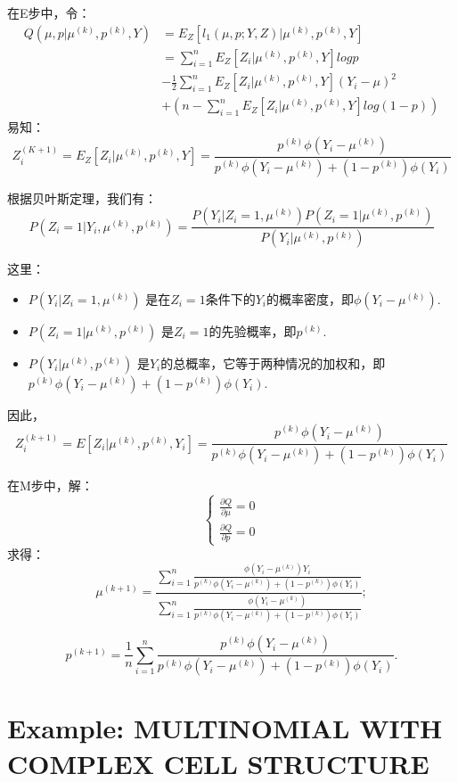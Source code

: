 \documentclass[UTF8,12pt]{ctexart}
\numberwithin{equation}{section}%
\begin{document}
	在E步中，令：
	\begin{align*}
		Q(\mu,p|\mu^{(k)},p^{(k)},Y)
		&=E_Z[l_1(\mu,p;Y,Z)|\mu^{(k)},p^{(k)},Y]\\
		&=\sum_{i=1}^{n}E_Z[Z_i|\mu^{(k)},p^{(k)},Y]logp\\
		&-\frac{1}{2}\sum_{i=1}^{n}E_Z[Z_i|\mu^{(k)},p^{(k)},Y](Y_i-\mu)^2\\
		&+(n-\sum_{i=1}^{n}E_Z[Z_i|\mu^{(k)},p^{(k)},Y]log(1-p))
	\end{align*}
	易知：
	$$Z_i^{(K+1)}=E_Z[Z_i|\mu^{(k)},p^{(k)},Y]=\frac{p^{(k)}\phi(Y_i-\mu^{(k)})}{p^{(k)}\phi(Y_i-\mu^{(k)})+(1-p^{(k)})\phi(Y_i)}$$
	
	\begin{mybox1}
		根据贝叶斯定理，我们有：
		\[ P(Z_i = 1 | Y_i, \mu^{(k)}, p^{(k)}) = \frac{P(Y_i | Z_i = 1, \mu^{(k)}) P(Z_i = 1 | \mu^{(k)}, p^{(k)})}{P(Y_i | \mu^{(k)}, p^{(k)})} \]
		
		这里：
		\begin{itemize}
			\item $P(Y_i | Z_i = 1, \mu^{(k)})$ 是在$Z_i = 1$条件下的$Y_i$的概率密度，即$\phi(Y_i - \mu^{(k)})$.
			\item $P(Z_i = 1 | \mu^{(k)}, p^{(k)})$ 是$Z_i = 1$的先验概率，即$p^{(k)}$.
			\item $P(Y_i | \mu^{(k)}, p^{(k)})$ 是$Y_i$的总概率，它等于两种情况的加权和，即$p^{(k)}\phi(Y_i - \mu^{(k)}) + (1 - p^{(k)})\phi(Y_i)$.
		\end{itemize}
		
		因此，	
		\[ Z_i^{(k+1)} = E[Z_i|\mu^{(k)},p^{(k)},Y_i] = \frac{p^{(k)}\phi(Y_i - \mu^{(k)})}{p^{(k)}\phi(Y_i - \mu^{(k)}) + (1 - p^{(k)})\phi(Y_i)} \]		
	\end{mybox1}
	
	在M步中，解：
	$$
	\left\{\begin{matrix}
		\frac{\partial Q}{\partial \mu}=0\\
		\frac{\partial Q}{\partial p}=0
	\end{matrix}\right.
	$$
	求得：
	$$
	\mu^{(k+1)}=\frac{\sum_{i=1}^{n}\frac{\phi(Y_i-\mu^{(k)})Y_i}{p^{(k)}\phi(Y_i-\mu^{(k)})+(1-p^{(k)})\phi(Y_i)}}{\sum_{i=1}^{n}\frac{\phi(Y_i-\mu^{(k)})}{p^{(k)}\phi(Y_i-\mu^{(k)})+(1-p^{(k)})\phi(Y_i)}};
	$$
	
	$$
		p^{(k+1)}=\frac{1}{n}\sum_{i=1}^{n}\frac{p^{(k)}\phi(Y_i-\mu^{(k)})}{p^{(k)}\phi(Y_i-\mu^{(k)})+(1-p^{(k)})\phi(Y_i)}.
	$$
	
	\section{Example: MULTINOMIAL WITH COMPLEX CELL STRUCTURE\label{cell example}}
\end{document}
